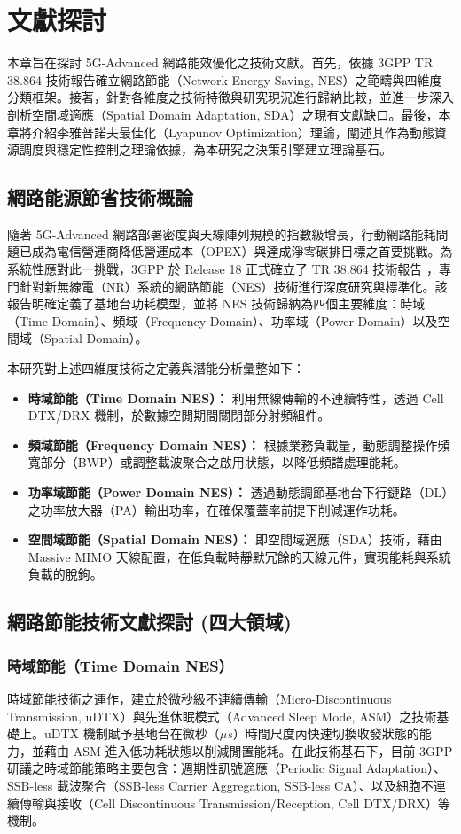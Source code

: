 
\section{文獻探討}
本章旨在探討 5G-Advanced 網路能效優化之技術文獻。首先，依據 3GPP TR 38.864 技術報告確立網路節能（Network Energy Saving, NES）之範疇與四維度分類框架。接著，針對各維度之技術特徵與研究現況進行歸納比較，並進一步深入剖析空間域適應（Spatial Domain Adaptation, SDA）之現有文獻缺口。最後，本章將介紹李雅普諾夫最佳化（Lyapunov Optimization）理論，闡述其作為動態資源調度與穩定性控制之理論依據，為本研究之決策引擎建立理論基石。
\subsection{網路能源節省技術概論}
隨著 5G-Advanced 網路部署密度與天線陣列規模的指數級增長，行動網路能耗問題已成為電信營運商降低營運成本（OPEX）與達成淨零碳排目標之首要挑戰。為系統性應對此一挑戰，3GPP 於 Release 18 正式確立了 TR 38.864 技術報告 \cite{3gpp2023_tr38864}，專門針對新無線電（NR）系統的網路節能（NES）技術進行深度研究與標準化。該報告明確定義了基地台功耗模型，並將 NES 技術歸納為四個主要維度：時域（Time Domain）、頻域（Frequency Domain）、功率域（Power Domain）以及空間域（Spatial Domain）。

本研究對上述四維度技術之定義與潛能分析彙整如下：
\begin{itemize}[leftmargin=2em]
    \item \textbf{時域節能（Time Domain NES）：} 利用無線傳輸的不連續特性，透過 Cell DTX/DRX 機制，於數據空閒期間關閉部分射頻組件。
    \item \textbf{頻域節能（Frequency Domain NES）：} 根據業務負載量，動態調整操作頻寬部分（BWP）或調整載波聚合之啟用狀態，以降低頻譜處理能耗。
    \item \textbf{功率域節能（Power Domain NES）：} 透過動態調節基地台下行鏈路（DL）之功率放大器（PA）輸出功率，在確保覆蓋率前提下削減運作功耗。
    \item \textbf{空間域節能（Spatial Domain NES）：} 即空間域適應（SDA）技術，藉由 Massive MIMO 天線配置，在低負載時靜默冗餘的天線元件，實現能耗與系統負載的脫鉤。
\end{itemize}

\subsection{網路節能技術文獻探討 (四大領域)}
\subsubsection{時域節能（Time Domain NES）}
    時域節能技術之運作，建立於微秒級不連續傳輸（Micro-Discontinuous Transmission, uDTX）與先進休眠模式（Advanced Sleep Mode, ASM）之技術基礎上。uDTX 機制賦予基地台在微秒（$\mu s$）時間尺度內快速切換收發狀態的能力，並藉由 ASM 進入低功耗狀態以削減閒置能耗。在此技術基石下，目前 3GPP 研議之時域節能策略主要包含：週期性訊號適應（Periodic Signal Adaptation）、SSB-less 載波聚合（SSB-less Carrier Aggregation, SSB-less CA）、以及細胞不連續傳輸與接收（Cell Discontinuous Transmission/Reception, Cell DTX/DRX）等機制。

